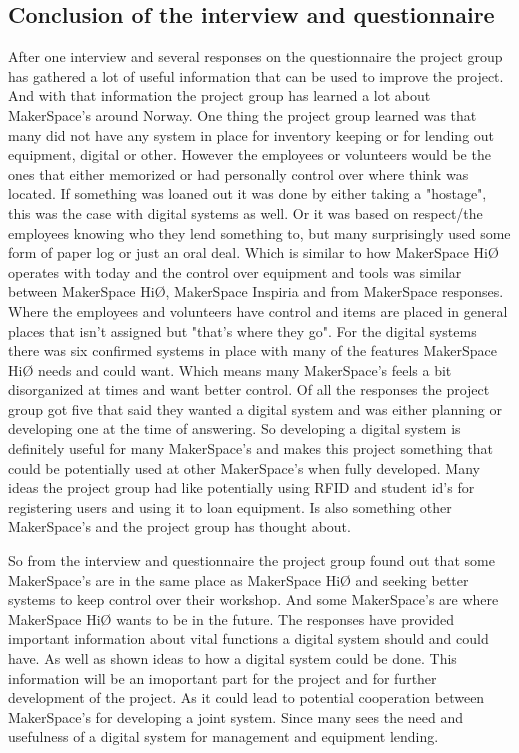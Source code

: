 \subsection{Conclusion of the interview and questionnaire}
After one interview and several responses on the questionnaire the project group has gathered a lot of useful information that can be used to improve the project. And with that information the project group has learned a lot about MakerSpace's around Norway. One thing the project group learned was that many did not have any system in place for inventory keeping or for lending out equipment, digital or other. However the employees or volunteers would be the ones that either memorized or had personally control over where think was located. If something was loaned out it was done by either taking a "hostage", this was the case with digital systems as well. Or it was based on respect/the employees knowing who they lend something to, but many surprisingly used some form of paper log or just an oral deal. Which is similar to how MakerSpace HiØ operates with today and the control over equipment and tools was similar between MakerSpace HiØ, MakerSpace Inspiria and from MakerSpace responses. Where the employees and volunteers have control and items are placed in general places that isn't assigned but "that's where they go". 
For the digital systems there was six confirmed systems in place with many of the features MakerSpace HiØ needs and could want. Which means many MakerSpace's feels a bit disorganized at times and want better control. Of all the responses the project group got five that said they wanted a digital system and was either planning or developing one at the time of answering. So developing a digital system is definitely useful for many MakerSpace's and makes this project something that could be potentially used at other MakerSpace's when fully developed. Many ideas the project group had like potentially using RFID and student id's for registering users and using it to loan equipment. Is also something other MakerSpace's and the project group has thought about. 

So from the interview and questionnaire the project group found out that some MakerSpace's are in the same place as MakerSpace HiØ and seeking better systems to keep control over their workshop. And some MakerSpace's are where MakerSpace HiØ wants to be in the future. The responses have provided important information about vital functions a digital system should and could have. As well as shown ideas to how a digital system could be done. This information will be an imoportant part for the project and for further development of the project. As it could lead to potential cooperation between MakerSpace's for developing a joint system. Since many sees the need and usefulness of a digital system for management and equipment lending.    

